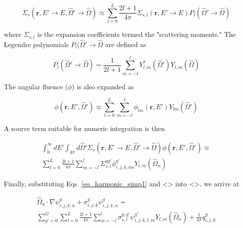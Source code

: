 \documentclass{article}
\numberwithin{equation}{subsection}
\begin{document}
\begin{equation} \label{eq_sigma_expansion}
\Sigma_s(\boldsymbol{r}, E' \rightarrow E, \hat{\Omega}' \rightarrow \hat{\Omega}) \approx \sum_{l=0}^L \frac{2l+1}{4 \pi} \Sigma_{s,l}(\boldsymbol{r}, E' \rightarrow E) P_l(\hat{\Omega}' \rightarrow \hat{\Omega})
\end{equation}

where $\Sigma_{s,l}$ is the expansion coefficients termed the "scattering moments." The Legendre polynomials $P_l(\hat{\Omega}' \rightarrow \hat{\Omega}$ are defined as

\begin{equation} \label{eq_harmonic}
P_l(\hat{\Omega}' \rightarrow \hat{\Omega}) = \frac{1}{2l+1}\sum_{m=-l}^l Y_{l,m}^*(\hat{\Omega}')Y_{l,m}(\hat{\Omega})
\end{equation}

The angular fluence ($\phi$) is also expanded as

\begin{equation}
\phi(\boldsymbol{r}, E', \hat{\Omega}') \approx \sum_{l=0}^L \sum_{m=-l}^l
\phi_{lm}(\boldsymbol{r}, E')Y_{lm}(\hat{\Omega}')
\end{equation}

\noindent
A source term suitable for numeric integration is then

\begin{equation}\label{eq_harmonic_simp1}
\begin{split}
\int_0^\infty dE' \int_{4 \pi} d\hat{\Omega}' \Sigma_s(\boldsymbol{r}, E' \rightarrow E, \hat{\Omega}' \rightarrow \hat{\Omega}) \phi(\boldsymbol{r}, E', \hat{\Omega}')
\approx \\
 \sum_{l=0}^L \frac{2l+1}{4 \pi} \sum_{m=-l}^l \Sigma_{s,l}^{gg'}\phi_{i,j,k,lm}^{g'}Y_{l,m}(\hat{\Omega}_n)
\end{split}
\end{equation}

Finally, substituting Eqs. \ref{eq_harmonic_simp1} and <> into <>, we arrive at

\begin{equation}\label{eq_discretized}
\begin{split}
\hat{\Omega}_n \cdot \nabla\psi_{i,j,k,n}^g + \sigma_{i,j,k}^g \psi_{i,j,k,n}^g = \\
\sum_{g' = 0}^G \sum_{l=0}^L \frac{2l+1}{4 \pi} \sum_{m=-l}^l \sigma_{s,l}^{g,g'}\psi_{i,j,k,l,m}^{g'}Y_{l,m}(\hat{\Omega}_n) + \frac{1}{4 \pi}q_{i,j,k}^g
\end{split}
\end{equation}
\end{document}

